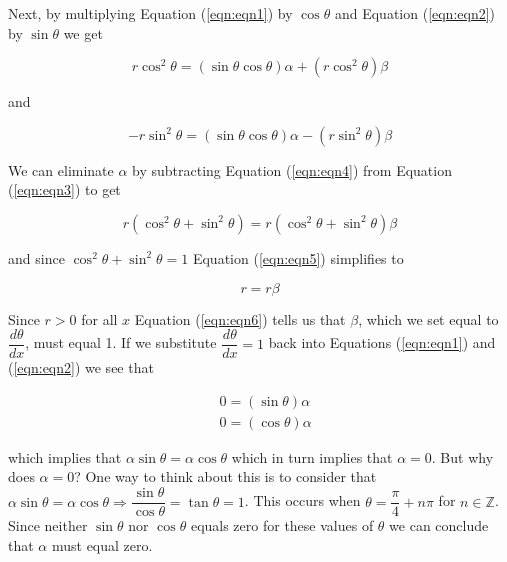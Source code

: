 \documentclass{article}
\theoremstyle{definition}
\begin{document}
\bigskip
\noindent
Next, by multiplying Equation (\ref{eqn:eqn1}) by $\cos \theta$ and
Equation (\ref{eqn:eqn2}) by $\sin \theta$ we get

\bigskip
\begin{equation}
r \cos^2 \theta = (\sin \theta \cos \theta) \alpha + (r \cos^2 \theta) \beta 
\label{eqn:eqn3}
\end{equation}

\bigskip
\noindent
and

\begin{equation}
- r \sin^2 \theta = (\sin \theta\cos \theta) \alpha - (r \sin^2 \theta) \beta 
\label{eqn:eqn4}
\end{equation}


\bigskip
\noindent
We can eliminate $\alpha$ by subtracting Equation (\ref{eqn:eqn4})
from Equation (\ref{eqn:eqn3}) to get 
 
\medskip
\begin{equation}
r (\cos^2 \theta + \sin^2 \theta)  = r (\cos^2 \theta + \sin^2 \theta)\beta
\label{eqn:eqn5}
\end{equation}

\bigskip
\noindent
and since $\cos^2 \theta + \sin^2 \theta = 1$ Equation
(\ref{eqn:eqn5}) simplifies to  

\medskip
\begin{equation}
r  = r \beta
\label{eqn:eqn6}
\end{equation}

\bigskip
\noindent
Since $r > 0$ for all $x$ Equation (\ref{eqn:eqn6}) tells us that
$\beta$, which we set equal to $\dfrac{d \theta}{dx}$, must equal
1.  If we substitute $\dfrac{d \theta}{dx} = 1$ back into
Equations (\ref{eqn:eqn1}) and (\ref{eqn:eqn2}) we see that


\medskip
\begin{equation*}
\begin{array}{lllll}
& 0 = (\sin \theta) \alpha \\
& 0 =  (\cos \theta) \alpha 
\end{array}
\end{equation*}

\bigskip
{
\noindent
which implies that $\alpha \sin \theta = \alpha \cos \theta$
which in turn implies that $\alpha = 0$. But why does $\alpha =
0$? One way to think about this is to consider that $\alpha \sin
\theta = \alpha \cos \theta \Rightarrow \dfrac{\sin \theta}{\cos
\theta} = \tan \theta = 1$.  This occurs when $\theta =
\dfrac{\pi}{4} + n \pi$ for $n \in \mathbb{Z}$. Since neither
$\sin \theta$ nor $\cos \theta$ equals zero for these values of
$\theta$ we can conclude that $\alpha$ must equal zero. \par}
\end{document}
